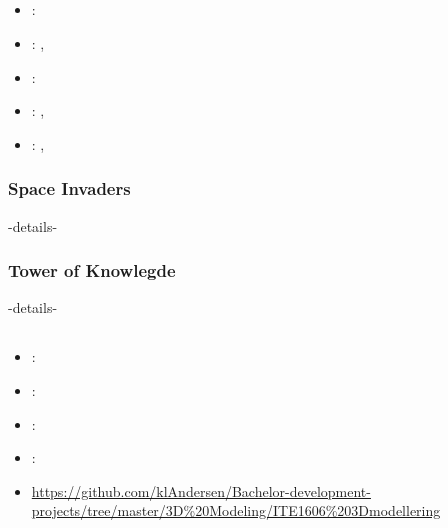 \subsection[Flash Programming]{}
\label{sec:flash_prog}
\begin{itemize} 
\item {}: 
\item {}: , 
\item {}: 
\item {}: , 
\item {}: , 
\end{itemize} 

\subsubsection{Space Invaders}
\label{sec:space_invaders}
-details-

\subsubsection{Tower of Knowlegde}
\label{sec:tower_of_knowledge}
-details-

\subsection[3D Modelling]{}
\label{sec:ite1606_3d_modelling}
\begin{itemize} 
	\item {}: 
	\item {}: 
	\item {}: 
	\item {}: 
	\item {} \url{https://github.com/klAndersen/Bachelor-development-projects/tree/master/3D%20Modeling/ITE1606%203Dmodellering}
\end{itemize} 


